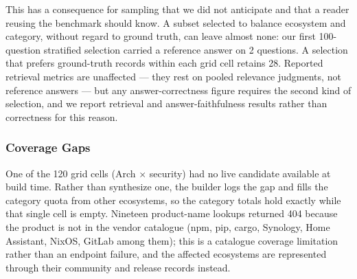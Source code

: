 This has a consequence for sampling that we did not anticipate and that a
reader reusing the benchmark should know. A subset selected to balance ecosystem
and category, without regard to ground truth, can leave almost none: our first
100-question stratified selection carried a reference answer on 2 questions. A
selection that prefers ground-truth records within each grid cell retains 28.
Reported retrieval metrics are unaffected --- they rest on pooled relevance
judgments, not reference answers --- but any answer-correctness figure requires
the second kind of selection, and we report retrieval and answer-faithfulness
results rather than correctness for this reason.

\subsubsection{Coverage Gaps}

One of the 120 grid cells (Arch $\times$ security) had no live candidate
available at build time. Rather than synthesize one, the builder logs the gap
and fills the category quota from other ecosystems, so the category totals hold
exactly while that single cell is empty. Nineteen product-name lookups returned
404 because the product is not in the vendor catalogue (npm, pip, cargo,
Synology, Home Assistant, NixOS, GitLab among them); this is a catalogue
coverage limitation rather than an endpoint failure, and the affected ecosystems
are represented through their community and release records instead.
